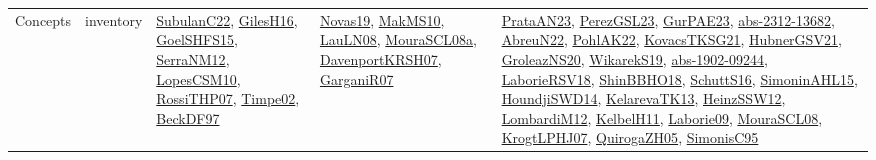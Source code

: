 {\begin{longtable}{lp{3cm}>{\raggedright}p{6cm}>{\raggedright}p{6cm}p{8cm}}
Concepts & inventory & \href{articles/SubulanC22.pdf}{SubulanC22}\cite{SubulanC22}, \href{papers/GilesH16.pdf}{GilesH16}\cite{GilesH16}, \href{articles/GoelSHFS15.pdf}{GoelSHFS15}\cite{GoelSHFS15}, \href{papers/SerraNM12.pdf}{SerraNM12}\cite{SerraNM12}, \href{articles/LopesCSM10.pdf}{LopesCSM10}\cite{LopesCSM10}, \href{papers/RossiTHP07.pdf}{RossiTHP07}\cite{RossiTHP07}, \href{articles/Timpe02.pdf}{Timpe02}\cite{Timpe02}, \href{papers/BeckDF97.pdf}{BeckDF97}\cite{BeckDF97} & \href{articles/Novas19.pdf}{Novas19}\cite{Novas19}, \href{papers/MakMS10.pdf}{MakMS10}\cite{MakMS10}, \href{papers/LauLN08.pdf}{LauLN08}\cite{LauLN08}, \href{papers/MouraSCL08a.pdf}{MouraSCL08a}\cite{MouraSCL08a}, \href{papers/DavenportKRSH07.pdf}{DavenportKRSH07}\cite{DavenportKRSH07}, \href{papers/GarganiR07.pdf}{GarganiR07}\cite{GarganiR07} & \href{articles/PrataAN23.pdf}{PrataAN23}\cite{PrataAN23}, \href{papers/PerezGSL23.pdf}{PerezGSL23}\cite{PerezGSL23}, \href{articles/GurPAE23.pdf}{GurPAE23}\cite{GurPAE23}, \href{articles/abs-2312-13682.pdf}{abs-2312-13682}\cite{abs-2312-13682}, \href{articles/AbreuN22.pdf}{AbreuN22}\cite{AbreuN22}, \href{articles/PohlAK22.pdf}{PohlAK22}\cite{PohlAK22}, \href{papers/KovacsTKSG21.pdf}{KovacsTKSG21}\cite{KovacsTKSG21}, \href{articles/HubnerGSV21.pdf}{HubnerGSV21}\cite{HubnerGSV21}, \href{papers/GroleazNS20.pdf}{GroleazNS20}\cite{GroleazNS20}, \href{articles/WikarekS19.pdf}{WikarekS19}\cite{WikarekS19}, \href{articles/abs-1902-09244.pdf}{abs-1902-09244}\cite{abs-1902-09244}, \href{articles/LaborieRSV18.pdf}{LaborieRSV18}\cite{LaborieRSV18}, \href{articles/ShinBBHO18.pdf}{ShinBBHO18}\cite{ShinBBHO18}, \href{papers/SchuttS16.pdf}{SchuttS16}\cite{SchuttS16}, \href{articles/SimoninAHL15.pdf}{SimoninAHL15}\cite{SimoninAHL15}, \href{papers/HoundjiSWD14.pdf}{HoundjiSWD14}\cite{HoundjiSWD14}, \href{papers/KelarevaTK13.pdf}{KelarevaTK13}\cite{KelarevaTK13}, \href{articles/HeinzSSW12.pdf}{HeinzSSW12}\cite{HeinzSSW12}, \href{articles/LombardiM12.pdf}{LombardiM12}\cite{LombardiM12}, \href{articles/KelbelH11.pdf}{KelbelH11}\cite{KelbelH11}, \href{papers/Laborie09.pdf}{Laborie09}\cite{Laborie09}, \href{papers/MouraSCL08.pdf}{MouraSCL08}\cite{MouraSCL08}, \href{papers/KrogtLPHJ07.pdf}{KrogtLPHJ07}\cite{KrogtLPHJ07}, \href{papers/QuirogaZH05.pdf}{QuirogaZH05}\cite{QuirogaZH05}, \href{papers/SimonisC95.pdf}{SimonisC95}\cite{SimonisC95}\\

\end{longtable}}
